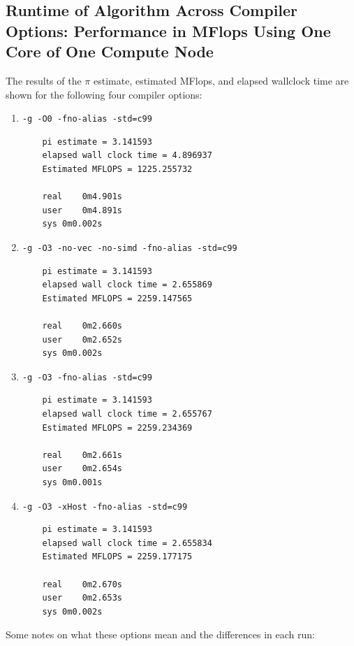 \documentclass{article}
\begin{document}
\subsection*{Runtime of Algorithm Across Compiler Options: Performance in MFlops Using One Core of One Compute Node}
The results of the $\pi$ estimate, estimated MFlops, and elapsed wallclock time are shown for the following four compiler options:
\begin{enumerate}
    \item \texttt{-g -O0 -fno-alias -std=c99}
    \begin{lstlisting}
    pi estimate = 3.141593
    elapsed wall clock time = 4.896937
    Estimated MFLOPS = 1225.255732

    real	0m4.901s
    user	0m4.891s
    sys	0m0.002s
    \end{lstlisting}
    \item \texttt{-g -O3 -no-vec -no-simd -fno-alias -std=c99}
    \begin{lstlisting}
    pi estimate = 3.141593
    elapsed wall clock time = 2.655869
    Estimated MFLOPS = 2259.147565
    
    real	0m2.660s
    user	0m2.652s
    sys	0m0.002s
    \end{lstlisting}
    \newpage
    \item \texttt{-g -O3 -fno-alias -std=c99}
    \begin{lstlisting}
    pi estimate = 3.141593
    elapsed wall clock time = 2.655767
    Estimated MFLOPS = 2259.234369
    
    real	0m2.661s
    user	0m2.654s
    sys	0m0.001s
    \end{lstlisting}
    \item \texttt{-g -O3 -xHost -fno-alias -std=c99}
    \begin{lstlisting}
    pi estimate = 3.141593
    elapsed wall clock time = 2.655834
    Estimated MFLOPS = 2259.177175
    
    real	0m2.670s
    user	0m2.653s
    sys	0m0.002s
    \end{lstlisting}
\end{enumerate}
Some notes on what these options mean and the differences in each run:
\end{document}

